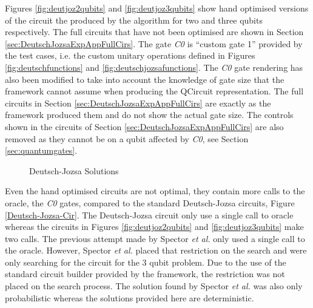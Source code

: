 Figures \ref{fig:deutjoz2qubits} and \ref{fig:deutjoz3qubits} show hand optimised versions of the circuit the produced by the algorithm for two and three qubits respectively.
The full circuits that have not been optimised are shown in Section \ref{sec:DeutschJozsaExpAppFullCirs}.
The gate \emph{C0} is ``custom gate 1'' provided by the test cases, i.e. the custom unitary operations defined in Figures \ref{fig:deutschfunctions} and \ref{fig:deutschjozsafunctions}.
The \emph{C0} gate rendering has also been modified to take into account the knowledge of gate size that the framework cannot assume when producing the QCircuit representation.
The full circuits in Section \ref{sec:DeutschJozsaExpAppFullCirs} are exactly as the framework produced them and do not show the actual gate size.
The controls shown in the circuits of Section \ref{sec:DeutschJozsaExpAppFullCirs} are also removed as they cannot be on a qubit affected by \emph{C0}, see Section \ref{sec:quantumgates}.

\begin{figure}
\centering
{}
\caption{Deutsch-Jozsa Solutions}
\end{figure}

Even the hand optimised circuits are not optimal, they contain more calls to the oracle, the \emph{C0} gates, compared to the standard Deutsch-Jozsa circuits, Figure \ref{Deutsch-Jozsa-Cir}.
The Deutsch-Jozsa circuit only use a single call to oracle whereas the circuits in Figures \ref{fig:deutjoz2qubits} and \ref{fig:deutjoz3qubits} make two calls.
The previous attempt made by Spector \emph{et al.}\cite{LSpectorGPforQC,LSpectorANDOR,Spector:1999:QCA:316573.317112} only used a single call to the oracle.
However, Spector \emph{et al.} placed that restriction on the search and were only searching for the circuit for the 3 qubit problem.
Due to the use of the standard circuit builder provided by the framework, the restriction was not placed on the search process.
The solution found by Spector \emph{et al.} was also only probabilistic whereas the solutions provided here are deterministic.

